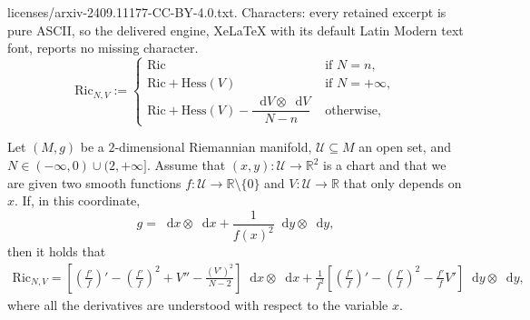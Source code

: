 \documentclass[10pt,a4paper]{amsart}
\newcommand{\Ric}{\mathrm{Ric}}
\newcommand*\diff{\mathop{}\!\mathrm{d}}
\newcommand{\hes}{\mathrm{Hess}}
\begin{document}
licenses/arxiv-2409.11177-CC-BY-4.0.txt. Characters: every retained excerpt is pure ASCII, so the delivered engine, XeLaTeX with its default Latin Modern text font, reports no missing character.
\begin{equation}
    \label{eq:NRicci}
    \Ric_{N,V}:= \begin{cases}
        \Ric & \text{ if } N=n, \\
        \Ric + \hes(V) & \text{ if } N=+\infty,\\
        \Ric+\hes(V)-\dfrac{\diff V\otimes\diff V}{N-n} & \text{ otherwise},
    \end{cases}
\end{equation}

\begin{lemma}
\label{e:Rictensor}
    Let $(M, g)$ be a $2$-dimensional Riemannian manifold, $\mathcal{U} \subseteq M$ an open set, and $N \in (-\infty, 0) \cup (2, +\infty]$. Assume that $(x, y) : \mathcal{U} \to \mathbb{R}^2$ is a chart and that we are given two smooth functions $f : \mathcal{U} \to \mathbb{R}\setminus \{0\}$ and $V : \mathcal{U} \to \mathbb{R}$ that only depends on $x$. If, in this coordinate,
    \[
    g = \diff x \otimes \diff x + \frac{1}{f(x)^2} \diff y \otimes \diff y,
    \]
    then it holds that
\begin{equation*}
        \begin{aligned}
            \Ric_{N,V} = \left[ \left(\frac{f'}{f}\right)' - \left(\frac{f'}{f}\right)^2 + V'' - \frac{(V')^2}{N - 2}\right] \diff x \otimes \diff x
            + \frac{1}{f^2}\left[\left(\frac{f'}{f}\right)' - \left(\frac{f'}{f}\right)^2 - \frac{f'}{f} V'\right] \diff y \otimes \diff y,
        \end{aligned}
\end{equation*}
where all the derivatives are understood with respect to the variable $x$.
\end{lemma}
\end{document}
